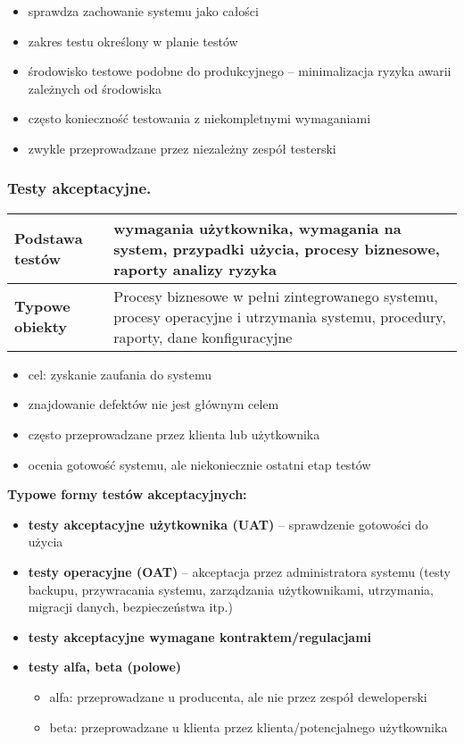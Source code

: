 \documentclass[../main.tex]{subfiles}
\begin{document}
    \begin{itemize}
        \item sprawdza zachowanie systemu jako całości
        \item zakres testu określony w planie testów
        \item środowisko testowe podobne do produkcyjnego – minimalizacja ryzyka awarii zależnych od środowiska
        \item często konieczność testowania z niekompletnymi wymaganiami
        \item zwykle przeprowadzane przez niezależny zespół testerski
    \end{itemize}


    \subsubsection{Testy akceptacyjne.}
    \begin{tabular}{|p{3cm}|p{13cm}|}
        \hline
        \textbf{Podstawa testów} & wymagania użytkownika, wymagania na system,
        przypadki użycia, procesy biznesowe, raporty
        analizy ryzyka\\
        \hline
        \textbf{Typowe obiekty} & Procesy biznesowe w pełni zintegrowanego
        systemu, procesy operacyjne i utrzymania systemu,
        procedury, raporty, dane konfiguracyjne\\
        \hline
    \end{tabular}

    \begin{itemize}
        \item cel: zyskanie zaufania do systemu
        \item znajdowanie defektów nie jest głównym celem
        \item często przeprowadzane przez klienta lub użytkownika
        \item ocenia gotowość systemu, ale niekoniecznie ostatni etap testów
    \end{itemize}

    \textbf{Typowe formy testów akceptacyjnych:}
    \begin{itemize}
        \item \textbf{testy akceptacyjne użytkownika (UAT)} – sprawdzenie gotowości do użycia
        \item \textbf{testy operacyjne (OAT)} – akceptacja przez administratora systemu (testy
        backupu, przywracania systemu, zarządzania użytkownikami, utrzymania,
        migracji danych, bezpieczeństwa itp.)
        \item \textbf{testy akceptacyjne wymagane kontraktem/regulacjami}
        \item \textbf{testy alfa, beta (polowe)}
        \begin{itemize}
            \item alfa: przeprowadzane u producenta, ale nie przez zespół deweloperski
            \item beta: przeprowadzane u klienta przez klienta/potencjalnego użytkownika
        \end{itemize}
    \end{itemize}
\end{document}
